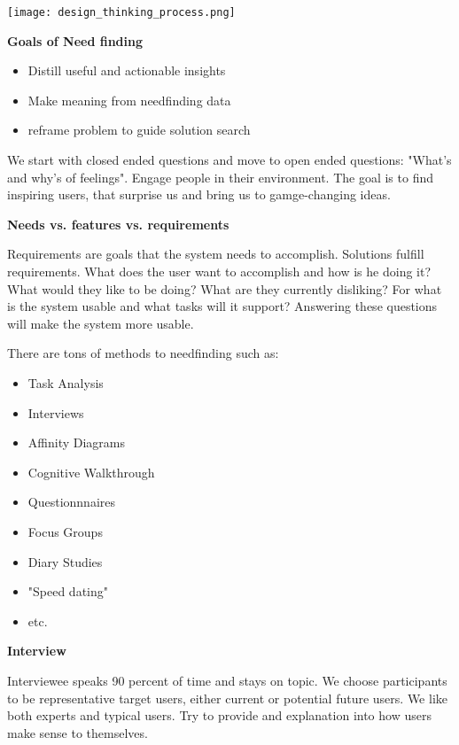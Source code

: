 \begin{center}
	\texttt{[image: design\_thinking\_process.png]}
\end{center}


\textbf{Goals of Need finding}


\begin{itemize}[itemsep=-5pt, topsep=3pt, leftmargin=*]
	\item Distill useful and actionable insights
	\item Make meaning from needfinding data
	\item reframe problem to guide solution search
\end{itemize}

\medskip

We start with closed ended questions and move to open ended questions: "What's and why's of feelings". Engage people in their environment.
The goal is to find inspiring users, that surprise us and bring us to gamge-changing ideas. \medskip

\textbf{Needs vs. features vs. requirements}

Requirements are goals that the system needs to accomplish. Solutions fulfill requirements. What does the user want to accomplish and how is he doing it?
What would they like to be doing? What are they currently disliking? For what is the system usable and what tasks will it support? Answering these questions will make the system more usable. \medskip

There are tons of methods to needfinding such as: 

\begin{multicols}{2}
    \begin{itemize}[itemsep=-5pt, topsep=-20pt, leftmargin=*]
	\item Task Analysis
	\item Interviews
	\item Affinity Diagrams
	\item Cognitive Walkthrough
	\item Questionnnaires
	\item Focus Groups
	\item Diary Studies
	\item "Speed dating"
	\item etc.
	\end{itemize}
\end{multicols}

\textbf{Interview}

Interviewee speaks 90 percent of time and stays on topic. We choose participants to be representative target users, either current or potential future users. We like both experts and typical users. Try to provide and explanation into how users make sense to themselves. \medskip

